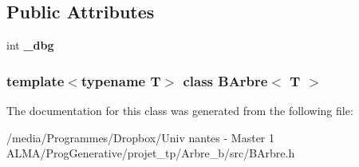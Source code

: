 \subsection*{Public Attributes}
\begin{DoxyCompactItemize}
\item 
\hypertarget{classBArbre_a3d3ca78a7094e8f5c32cd870b1b43d32}{
int {\bfseries \_\-dbg}}
\label{classBArbre_a3d3ca78a7094e8f5c32cd870b1b43d32}

\end{DoxyCompactItemize}
\subsubsection*{template$<$typename T$>$ class BArbre$<$ T $>$}



The documentation for this class was generated from the following file:\begin{DoxyCompactItemize}
\item 
/media/Programmes/Dropbox/Univ nantes -\/ Master 1 ALMA/ProgGenerative/projet\_\-tp/Arbre\_\-b/src/BArbre.h\end{DoxyCompactItemize}
